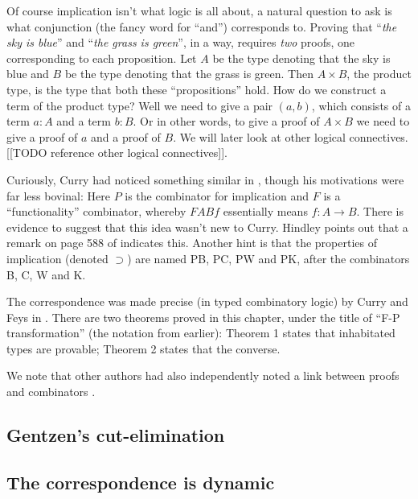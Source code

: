Of course implication isn't what logic is all about, a natural question to ask is what conjunction (the fancy word for ``and'') corresponds to. Proving that ``\emph{the sky is blue}'' and ``\emph{the grass is green}'', in a way, requires \emph{two} proofs, one corresponding to each proposition. Let $A$ be the type denoting that the sky is blue and $B$ be the type denoting that the grass is green. Then $A \times B$, the product type, is the type that both these ``propositions'' hold. How do we construct a term of the product type? Well we need to give a pair $(a, b)$, which consists of a term $a : A$ and a term $b : B$. Or in other words, to give a proof of $A \times B$ we need to give a proof of $a$ and a proof of $B$. We will later look at other logical connectives. [[TODO reference other logical connectives]].

Curiously, Curry had noticed something similar in \cite[footnote 28]{10.2307/2266302}, though his motivations were far less bovinal: 
Here $P$ is the combinator for implication and $F$ is a ``functionality'' combinator, whereby $F A B f$ essentially means $f : A \to B$.
There is evidence to suggest that this idea wasn't new to Curry. Hindley \cite{hindley_1997} points out that a remark on page 588 of \cite{10.2307/86796} indicates this. Another hint is that the properties of implication (denoted $\supset$) are named PB, PC, PW and PK, after the combinators B, C, W and K.

The correspondence was made precise (in typed combinatory logic) by Curry and Feys in \cite[Chapter 9]{curry1958combinatory}. There are two theorems proved in this chapter, under the title of ``F-P transformation'' (the notation from earlier): Theorem 1 states that inhabitated types are provable; Theorem 2 states that the converse.

We note that other authors had also independently noted a link between proofs and combinators \cite{meredith1963}. 

\subsection{Gentzen's cut-elimination}




\subsection{The correspondence is dynamic}






